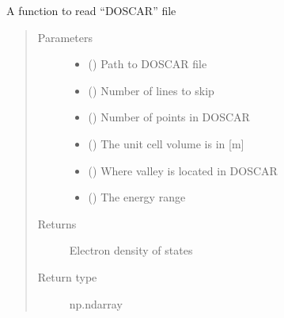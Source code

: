 \documentclass[letterpaper,10pt,english]{sphinxmanual}
\begin{document}
\begin{fulllineitems}
\label{\detokenize{autosummary/ThermoElectric.electron_density:ThermoElectric.electron_density}}
\sphinxAtStartPar
A function to read “DOSCAR” file
\begin{quote}\begin{description}
\item[{Parameters}] \leavevmode\begin{itemize}
\item {} 
\sphinxAtStartPar
{} () \textendash{} Path to DOSCAR file

\item {} 
\sphinxAtStartPar
{} () \textendash{} Number of lines to skip

\item {} 
\sphinxAtStartPar
{} () \textendash{} Number of points in DOSCAR

\item {} 
\sphinxAtStartPar
{} () \textendash{} The unit cell volume is in {[}m{]}

\item {} 
\sphinxAtStartPar
{} () \textendash{} Where valley is located in DOSCAR

\item {} 
\sphinxAtStartPar
{} () \textendash{} The energy range

\end{itemize}

\item[{Returns}] \leavevmode
\sphinxAtStartPar
{} \textendash{} Electron density of states

\item[{Return type}] \leavevmode
\sphinxAtStartPar
np.ndarray

\end{description}\end{quote}

\end{fulllineitems}
\end{document}
